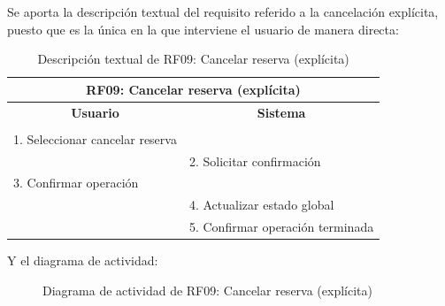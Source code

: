 \begin{itemize}
	Se aporta la descripción textual del requisito referido a la cancelación explícita, puesto que es la única en la que interviene el usuario de manera directa:
	\begin{table}[h]
		\centering	
		\begin{tabular}{|l|l|}
			\hline
			\multicolumn{2}{|c|}{\textbf{RF09: Cancelar reserva (explícita)}} \\ \hline
			\multicolumn{1}{|c|}{\textbf{Usuario}} & \multicolumn{1}{c|}{\textbf{Sistema}} \\ \hline
			[Pto. inclusión: RF08: Reservar] &\\ \hline
			1. Seleccionar cancelar reserva &\\ \hline
			& 2. Solicitar confirmación \\ \hline
			3. Confirmar operación &\\ \hline
			& 4. Actualizar estado global \\ \hline
			& 5. Confirmar operación terminada \\ \hline 	
		\end{tabular}
		\caption{Descripción textual de RF09: Cancelar reserva (explícita)}
		\label{tab:tablaDescTextualRF09}
	\end{table}
	
	Y el diagrama de actividad:
	\begin{figure}[!htb]
		\centering
		\caption{Diagrama de actividad de RF09: Cancelar reserva (explícita)}
		\label{fig:diagramaActividad_RF09}
	\end{figure}
	

\end{itemize}
